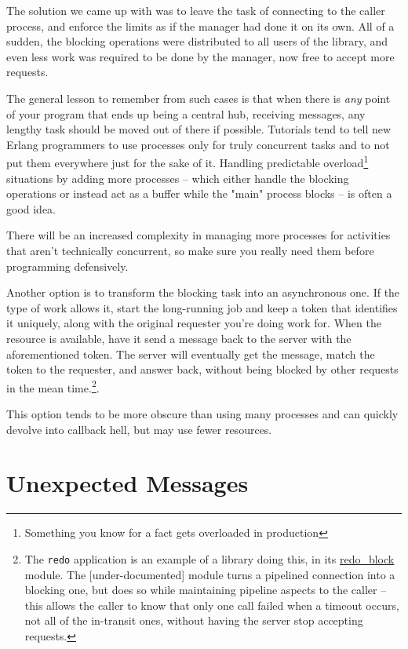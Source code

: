 \documentclass[11pt, oneside]{book}   	%
\newcommand{\otpapp}[1]{\Verb`#1`}
\begin{document}
The solution we came up with was to leave the task of connecting to the caller process, and enforce the limits as if the manager had done it on its own. All of a sudden, the blocking operations were distributed to all users of the library, and even less work was required to be done by the manager, now free to accept more requests.

The general lesson to remember from such cases is that when there is \emph{any} point of your program that ends up being a central hub, receiving messages, any lengthy task should be moved out of there if possible. Tutorials tend to tell new Erlang programmers to use processes only for truly concurrent tasks and to not put them everywhere just for the sake of it. Handling predictable overload\footnote{Something you know for a fact gets overloaded in production} situations by adding more processes -- which either handle the blocking operations or instead act as a buffer while the "main" process blocks -- is often a good idea.

There will be an increased complexity in managing more processes for activities that aren't technically concurrent, so make sure you really need them before programming defensively.

Another option is to transform the blocking task into an asynchronous one. If the type of work allows it, start the long-running job and keep a token that identifies it uniquely, along with the original requester you're doing work for. When the resource is available, have it send a message back to the server with the aforementioned token. The server will eventually get the message, match the token to the requester, and answer back, without being blocked by other requests in the mean time.\footnote{The \otpapp{redo} application is an example of a library doing this, in its \href{https://github.com/JacobVorreuter/redo/blob/master/src/redo\_block.erl}{redo\_block} module. The [under-documented] module turns a pipelined connection into a blocking one, but does so while maintaining pipeline aspects to the caller -- this allows the caller to know that only one call failed when a timeout occurs, not all of the in-transit ones, without having the server stop accepting requests.}.

This option tends to be more obscure than using many processes and can quickly devolve into callback hell, but may use fewer resources.

\section{Unexpected Messages}
\end{document}
